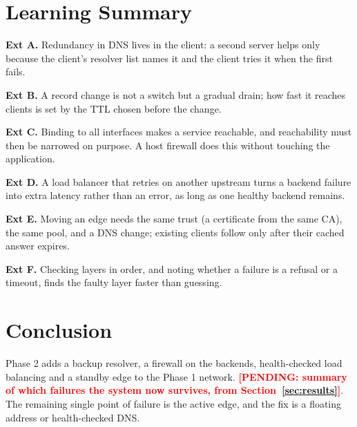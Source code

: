 \documentclass[conference]{IEEEtran}
\newcommand{\pending}[1]{\textcolor{red}{\textbf{[PENDING: #1]}}}
\begin{document}
\section{Learning Summary}
\textbf{Ext A.} Redundancy in DNS lives in the client: a second server
helps only because the client's resolver list names it and the client
tries it when the first fails.

\textbf{Ext B.} A record change is not a switch but a gradual drain; how
fast it reaches clients is set by the TTL chosen before the change.

\textbf{Ext C.} Binding to all interfaces makes a service reachable, and
reachability must then be narrowed on purpose. A host firewall does this
without touching the application.

\textbf{Ext D.} A load balancer that retries on another upstream turns a
backend failure into extra latency rather than an error, as long as one
healthy backend remains.

\textbf{Ext E.} Moving an edge needs the same trust (a certificate from
the same CA), the same pool, and a DNS change; existing clients follow
only after their cached answer expires.

\textbf{Ext F.} Checking layers in order, and noting whether a failure is
a refusal or a timeout, finds the faulty layer faster than guessing.

\section{Conclusion}
Phase 2 adds a backup resolver, a firewall on the backends, health-checked
load balancing and a standby edge to the Phase 1 network.
\pending{summary of which failures the system now survives, from
Section~\ref{sec:results}}. The remaining single point of failure is the
active edge, and the fix is a floating address or health-checked DNS.
\end{document}
